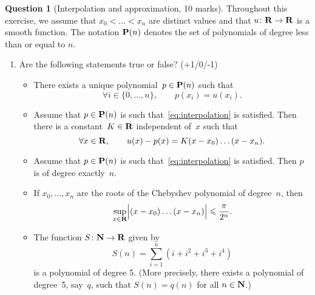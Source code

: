 \documentclass[11pt]{article}
\theoremstyle{definition}
\newtheorem{question}{Question}
\theoremstyle{remark}
\begin{document}
\newpage
\begin{question}
    [Interpolation and approximation, 10 marks]
    Throughout this exercise, we assume
    that $x_0 < \dotsc < x_n$ are distinct values and
    that $u \colon \mathbf R \to \mathbf R$ is a smooth function.
    The notation $\mathbf P(n)$ denotes the set of polynomials of degree less than or equal to $n$.

    \begin{enumerate}
        \item
            Are the following statements true or false? (+1/0/-1)
            \begin{itemize}
                \item
                    There exists a unique polynomial~$p \in \mathbf P(n)$ such that
                    \begin{equation}
                        \label{eq:interpolation}
                        \forall i \in \{0, \dotsc, n\}, \qquad
                        p(x_i) = u (x_i).
                    \end{equation}

                \item
                    Assume that $p \in \mathbf P(n)$ is such that~\eqref{eq:interpolation} is satisfied.
                    Then there is a constant~$K \in \mathbf R$ independent of~$x$ such that
                    \[
                        \forall x \in \mathbf R,
                        \qquad u(x) - p(x) = K (x - x_0) \dotsc (x - x_n).
                    \]

                \item
                    Assume that $p \in \mathbf P(n)$ is such that~\eqref{eq:interpolation} is satisfied.
                    Then $p$ is of degree exactly~$n$.

                \item
                    If $x_0, \dotsc, x_n$ are the roots of the Chebyshev polynomial of degree~$n$,
                    then
                    \[
                        \sup_{x \in \mathbf R} \Bigl\lvert (x - x_0) \dotsc (x - x_n) \Bigr\rvert \leqslant \frac{\pi}{2^n}.
                    \]

                \item
                    The function $S\colon \mathbf N \to \mathbf R$ given by
                    \[
                        S(n) = \sum_{i=1}^{n} \left(i + i^2 + i^3 + i^4\right)
                    \]
                    is a polynomial of degree 5.
                    (More precisely, there exists a polynomial of degree~5,
                    say~$q$, such that $S(n) = q(n)$ for all $n \in \mathbf N$.)


\end{itemize}
\end{enumerate}
\end{question}
\end{document}
